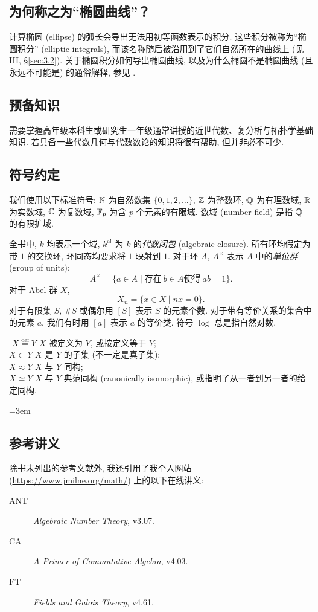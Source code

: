 \subsection*{为何称之为“椭圆曲线”？}
计算椭圆 (ellipse) 的弧长会导出无法用初等函数表示的积分. 这些积分被称为“椭圆积分” (elliptic integrals), 而该名称随后被沿用到了它们自然所在的曲线上 (见 III, \S\ref{sec:3.2}). 关于椭圆积分如何导出椭圆曲线, 以及为什么椭圆不是椭圆曲线 (且永远不可能是) 的通俗解释, 参见 \cite{rice2012}.

\subsection*{预备知识}
需要掌握高年级本科生或研究生一年级通常讲授的近世代数、复分析与拓扑学基础知识. 若具备一些代数几何与代数数论的知识将很有帮助, 但并非必不可少.

\subsection*{符号约定}
我们使用以下标准符号: $\mathbb{N}$ 为自然数集 $\{0,1,2,\dots\}$, $\mathbb{Z}$ 为整数环, $\mathbb{Q}$ 为有理数域, $\mathbb{R}$ 为实数域, $\mathbb{C}$ 为复数域, $\mathbb{F}_p$ 为含 $p$ 个元素的有限域. 数域 (number field) 是指 $\mathbb{Q}$ 的有限扩域.

全书中, $k$ 均表示一个域, $k^{\mathrm{al}}$ 为 $k$ 的\textit{代数闭包} (algebraic closure). 所有环均假定为带 $1$ 的交换环, 环同态均要求将 $1$ 映射到 $1$. 对于环 $A$, $A^\times$ 表示 $A$ 中的\textit{单位群} (group of units): 
\[
A^\times = \{a \in A \mid \text{存在}\  b \in A \text{使得}\  ab = 1\}.
\]
对于 Abel 群 $X$,
\[
X_n = \{x \in X \mid nx = 0\}.
\]
对于有限集 $S$, $\# S$ 或偶尔用 $[ S ]$ 表示 $S$ 的元素个数. 对于带有等价关系的集合中的元素 $a$, 我们有时用 $[a]$ 表示 $a$ 的等价类. 符号 $\log$ 总是指自然对数.

\begin{tabbing}
\hspace{2.5cm} \= \kill
$X \stackrel{\mathrm{def}}{=} Y$ \> $X$ 被定义为 $Y$, 或按定义等于 $Y$; \\
$X \subset Y$ \> $X$ 是 $Y$ 的子集 (不一定是真子集); \\
$X \approx Y$ \> $X$ 与 $Y$ 同构; \\
$X \simeq Y$ \> $X$ 与 $Y$ 典范同构 (canonically isomorphic), 或指明了从一者到另一者的给定同构.
\end{tabbing}

{\emergencystretch=3em \subsection*{参考讲义}
除书末列出的参考文献外, 我还引用了我个人网站 (\url{https://www.jmilne.org/math/}) 上的以下在线讲义: \par}
\begin{description}
\item[ANT] \textit{Algebraic Number Theory}, v3.07.
\item[CA] \textit{A Primer of Commutative Algebra}, v4.03.
\item[FT] \textit{Fields and Galois Theory}, v4.61.
\end{description}

